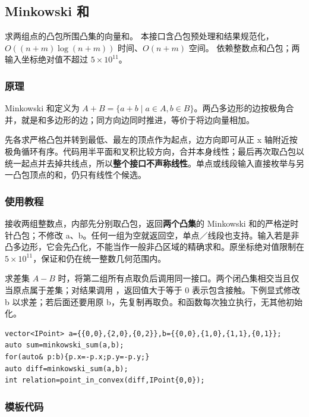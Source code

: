 \subsection{Minkowski 和}
\label{geo:minkowski}
\AlgorithmInfo
    {求两组点的凸包所围凸集的向量和。}
    {本接口含凸包预处理和结果规范化，$O((n+m)\log(n+m))$ 时间、$O(n+m)$ 空间。}
    {依赖整数点和凸包；两输入坐标绝对值不超过 $5\times10^{11}$。}
\subsubsection*{原理}

Minkowski 和定义为 $A+B=\{a+b\mid a\in A,b\in B\}$。两凸多边形的边按极角合并，就是和多边形的边；同方向边同时推进，等价于将边向量相加。

先各求严格凸包并转到最低、最左的顶点作为起点，边方向即可从正 x 轴附近按极角循环有序。代码用半平面和叉积比较方向，合并本身线性；最后再次取凸包以统一起点并去掉共线点，所以\textbf{整个接口不声称线性}。单点或线段输入直接枚举与另一凸包顶点的和，仍只有线性个候选。

\subsubsection*{使用教程}
 接收两组整数点，内部先分别取凸包，返回\textbf{两个凸集}的 Minkowski 和的严格逆时针凸包；不修改 a、b。任何一组为空就返回空，单点／线段也支持。输入若是非凸多边形，它会先凸化，不能当作一般非凸区域的精确求和。原坐标绝对值限制在 $5\times10^{11}$，保证和仍在统一整数几何范围内。

求差集 $A-B$ 时，将第二组所有点取负后调用同一接口。两个闭凸集相交当且仅当原点属于差集；对结果调用 ，返回值大于等于 0 表示包含接触。下例显式修改 b 以求差；若后面还要用原 b，先复制再取负。和函数每次独立执行，无其他初始化。
\begin{lstlisting}[style=mtycpp,numbers=none]
vector<IPoint> a={{0,0},{2,0},{0,2}},b={{0,0},{1,0},{1,1},{0,1}};
auto sum=minkowski_sum(a,b);
for(auto& p:b){p.x=-p.x;p.y=-p.y;}
auto diff=minkowski_sum(a,b);
int relation=point_in_convex(diff,IPoint{0,0});
\end{lstlisting}
\subsubsection*{模板代码}
